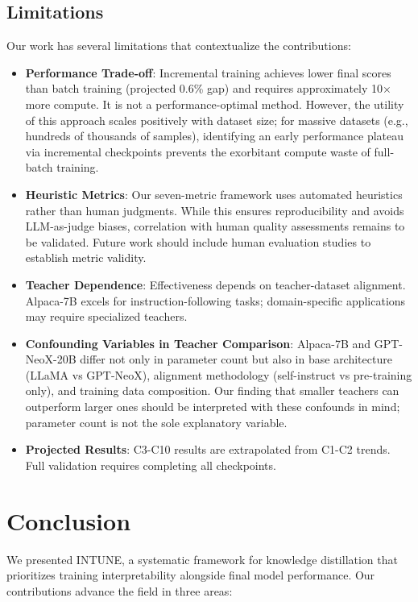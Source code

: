 \documentclass[sigconf]{acmart}
\begin{document}
\subsection{Limitations}

Our work has several limitations that contextualize the contributions:

\begin{itemize}
    \item \textbf{Performance Trade-off}: Incremental training achieves lower final scores than batch training (projected 0.6\% gap) and requires approximately 10× more compute. It is not a performance-optimal method. However, the utility of this approach scales positively with dataset size; for massive datasets (e.g., hundreds of thousands of samples), identifying an early performance plateau via incremental checkpoints prevents the exorbitant compute waste of full-batch training.
    \item \textbf{Heuristic Metrics}: Our seven-metric framework uses automated heuristics rather than human judgments. While this ensures reproducibility and avoids LLM-as-judge biases, correlation with human quality assessments remains to be validated. Future work should include human evaluation studies to establish metric validity.
    \item \textbf{Teacher Dependence}: Effectiveness depends on teacher-dataset alignment. Alpaca-7B excels for instruction-following tasks; domain-specific applications may require specialized teachers.
    \item \textbf{Confounding Variables in Teacher Comparison}: Alpaca-7B and GPT-NeoX-20B differ not only in parameter count but also in base architecture (LLaMA vs GPT-NeoX), alignment methodology (self-instruct vs pre-training only), and training data composition. Our finding that smaller teachers can outperform larger ones should be interpreted with these confounds in mind; parameter count is not the sole explanatory variable.
    \item \textbf{Projected Results}: C3-C10 results are extrapolated from C1-C2 trends. Full validation requires completing all checkpoints.
\end{itemize}

\section{Conclusion}

We presented INTUNE, a systematic framework for knowledge distillation that prioritizes training interpretability alongside final model performance. Our contributions advance the field in three areas:
\end{document}
